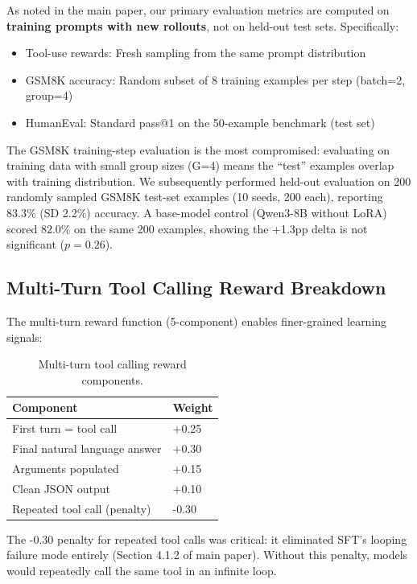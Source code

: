 \documentclass{article}
\begin{document}
As noted in the main paper, our primary evaluation metrics are computed on \textbf{training prompts with new rollouts}, not on held-out test sets. Specifically:
\begin{itemize}
    \item Tool-use rewards: Fresh sampling from the same prompt distribution
    \item GSM8K accuracy: Random subset of 8 training examples per step (batch=2, group=4)
    \item HumanEval: Standard pass@1 on the 50-example benchmark (test set)
\end{itemize}

The GSM8K training-step evaluation is the most compromised: evaluating on training data with small group sizes (G=4) means the ``test'' examples overlap with training distribution. We subsequently performed held-out evaluation on 200 randomly sampled GSM8K test-set examples (10 seeds, 200 each), reporting 83.3\% (SD 2.2\%) accuracy. A base-model control (Qwen3-8B without LoRA) scored 82.0\% on the same 200 examples, showing the +1.3pp delta is not significant ($p{=}0.26$).

\subsection{Multi-Turn Tool Calling Reward Breakdown}

The multi-turn reward function (5-component) enables finer-grained learning signals:

\begin{table}[htbp]
    \centering
    \caption{Multi-turn tool calling reward components.}
    \begin{tabular}{ll}
        \toprule
        Component & Weight \\
        \midrule
        First turn = tool call & +0.25 \\
        Final natural language answer & +0.30 \\
        Arguments populated & +0.15 \\
        Clean JSON output & +0.10 \\
        Repeated tool call (penalty) & -0.30 \\
        \bottomrule
    \end{tabular}
    \label{tab:multiturn_reward}
\end{table}

The -0.30 penalty for repeated tool calls was critical: it eliminated SFT's looping failure mode entirely (Section 4.1.2 of main paper). Without this penalty, models would repeatedly call the same tool in an infinite loop.
\end{document}
